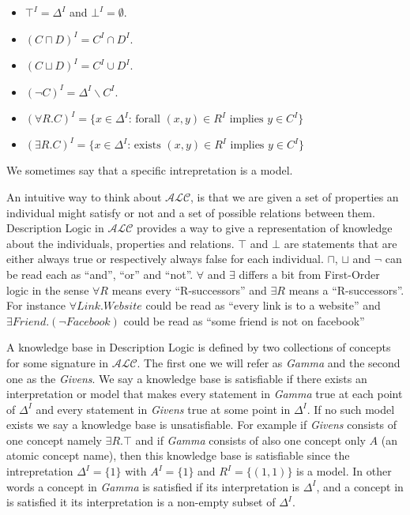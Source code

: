 \begin{itemize}
\item $\top^{I} = \Delta^{I}$ and $\bot^{I} = \emptyset$.
\item $(C \sqcap D)^{I} = C^{I} \cap D^{I}$.
\item $(C \sqcup D)^{I} = C^{I} \cup D^{I}$.
\item $(\neg C)^{I} = \Delta^{I} \backslash C^{I}$.
\item $(\forall R . C)^{I} = \{x \in \Delta^{I} \text{: forall } (x,y) \in R^{I} \text{ implies } y \in C^{I}\}$ 
\item $(\exists R . C)^{I} = \{x \in \Delta^{I} \text{: exists } (x,y) \in R^{I} \text{ implies } y \in C^{I}\}$ 
\end{itemize}

We sometimes say that a specific intrepretation is a model. 

An intuitive way to think about $\mathcal{ALC}$, is that we are given
a set of properties an individual might satisfy or not and a set of
possible relations between them. Description Logic in $\mathcal{ALC}$
provides a way to give a representation of knowledge about the
individuals, properties and relations.  $\top$ and $\bot$ are
statements that are either always true or respectively always false
for each individual.  $\sqcap$, $\sqcup$ and $\neg$ can be read each
as ``and'', ``or'' and ``not''. $\forall$ and $\exists$ differs a bit
from First-Order logic in the sense $\forall R$ means every
``R-successors'' and $\exists R$ means a ``R-successors''. For
instance $\forall Link . Website$ could be read as ``every link is to
a website'' and $\exists Friend . (\neg Facebook)$ could be read as
``some friend is not on facebook''

A knowledge base in Description Logic is defined by two collections of
concepts for some signature in $\mathcal{ALC}$. The first one we will
refer as \textit{Gamma} and the second one as the \textit{Givens}. We
say a knowledge base is satisfiable if there exists an interpretation
or model that makes every statement in \textit{Gamma} true at each
point of $\Delta^{I}$ and every statement in \textit{Givens} true at
some point in $\Delta^{I}$. If no such model exists we say a knowledge
base is unsatisfiable. For example if \textit{Givens} consists of one
concept namely $\exists R. \top$ and if \textit{Gamma} consists of
also one concept only $A$ (an atomic concept name), then this
knowledge base is satisfiable since the intrepretation $\Delta^{I}
= \{1\}$ with $A^{I} = \{1\}$ and $R^{I} = \{(1,1)\}$ is a model. In
other words a concept in \textit{Gamma} is satisfied if its
interpretation is $\Delta^{I}$, and a concept in  is
satisfied it its interpretation is a non-empty subset of $\Delta^{I}$.
